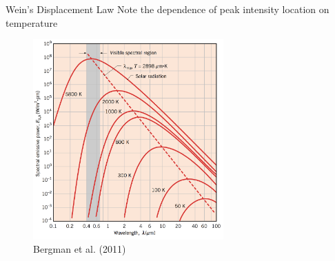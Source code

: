 \begin{frame}{Wein's Displacement Law}
Note the dependence of peak intensity location on temperature
\begin{figure}
\includegraphics[width=0.65\textwidth]{fig1.png}	
\centering \tiny~\\Bergman et al. (2011)
\end{figure}
\end{frame}

